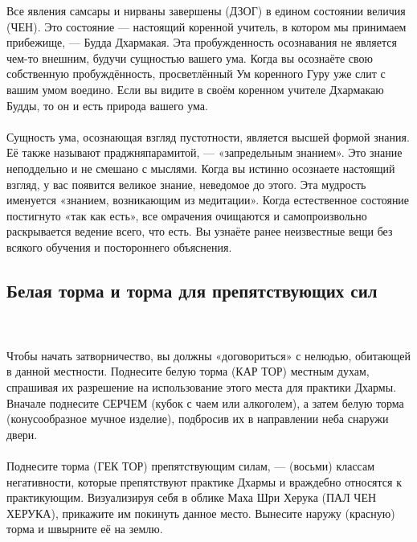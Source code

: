       Все явления самса\-ры и нирваны завершены (ДЗОГ) в едином состоянии величия (ЧЕН).
      Это состояние — настоящий коренной учитель, в котором мы принимаем прибежище,
      — Будда Дхармакая. Эта пробужденность осознавания не является чем-то внешним,
      будучи сущностью вашего ума. Когда вы осознаёте свою собственную пробуждённость,
      просветлённый Ум коренного Гуру уже слит с вашим умом воедино.
      Если вы видите в своём коренном учителе Дхармакаю Будды,
      то он и есть природа вашего ума.
\\ \\ Сущность ума, осознающая взгляд пустотности, является высшей формой знания.
      Её также называют праджняпарамитой, — «запредельным знанием».
      Это знание неподдельно и не смешано с мыслями. Когда вы истинно осознаете
      настоящий взгляд, у вас появится великое знание, неведомое до этого.
      Эта мудрость именуется «знанием, возникающим из медитации».
      Когда естественное состояние постигнуто «так как есть»,
      все омрачения очищаются и самопроизвольно раскрывается ведение всего,
      что есть. Вы узнаёте ранее неизвестные вещи без всякого обучения
      и постороннего объяснения.
\newpage
\subsection{Белая торма и торма для препятствующих сил}
\\ \\ Чтобы начать затворничество, вы должны «договориться» с нелюдью, обитающей в данной местности. Поднесите белую торма (КАР ТОР) местным духам, спрашивая их разрешение на использование этого места для практики Дхармы. Вначале поднесите СЕРЧЕМ (кубок с чаем или алкоголем), а затем белую торма (конусообразное мучное изделие), подбросив их в направлении неба снаружи двери.
\\ \\ Поднесите торма (ГЕК ТОР) препятствующим силам, — (восьми) классам негативности, которые препятствуют практике Дхармы и враждебно относятся к практикующим. Визуализируя себя в облике Маха Шри Херука (ПАЛ ЧЕН ХЕРУКА), прикажите им покинуть данное место. Вынесите наружу (красную) торма и швырните её на землю.
